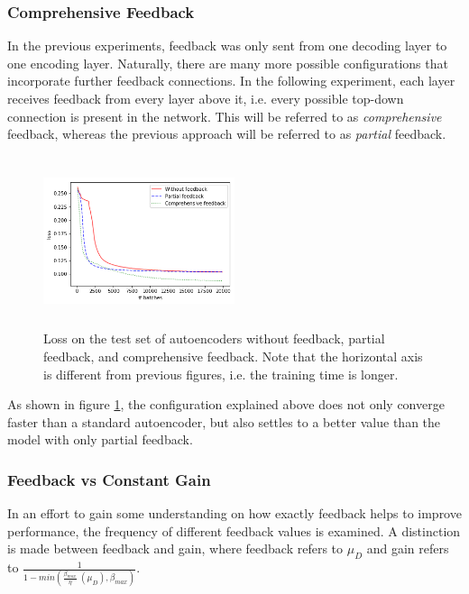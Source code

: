 \documentclass{article}
\begin{document}
 
\subsubsection{Comprehensive Feedback}
In the previous experiments, feedback was only sent from one decoding layer to one encoding layer. Naturally, there are many more possible configurations that incorporate further feedback connections. In the following experiment, each layer receives feedback from every layer above it, i.e. every possible top-down connection is present in the network. This will be referred to as \emph{comprehensive} feedback, whereas the previous approach will be referred to as \emph{partial} feedback. 

  \begin{figure}
      \centering
      \includegraphics[width=0.5\textwidth,height=5cm,keepaspectratio]{img/fullfb.png}
      \caption{Loss on the test set of autoencoders without feedback, partial feedback, and comprehensive feedback. Note that the horizontal axis is different from previous figures, i.e. the training time is longer. }
      \label{fig:fullfeedback}
  \end{figure}
  
  As shown in figure \ref{fig:fullfeedback}, the configuration explained above does not only converge faster than a standard autoencoder, but also settles to a better value than the model with only partial feedback. 
    
 \subsubsection{Feedback vs Constant Gain} 
 \label{constantgain}
 In an effort to gain some understanding on how exactly feedback helps to improve performance, the frequency of different feedback values is examined.  A distinction is made between feedback and gain, where feedback refers to $\mu_D$ and gain refers to $\frac{1}{1 - min(\frac{\beta_{max}}{\eta} \ (\mu_D), \beta_{max})}$. 
 
\end{document}

